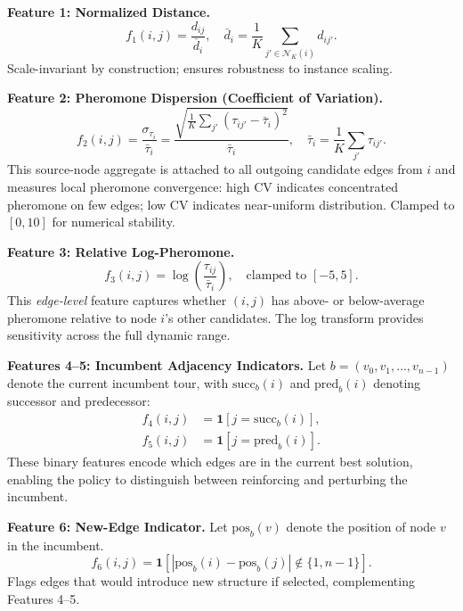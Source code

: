 \documentclass[sigconf,nonacm]{acmart}
\begin{document}
\textbf{Feature 1: Normalized Distance.}
\begin{equation}
f_1(i,j) = \frac{d_{ij}}{\bar{d}_i}, \quad \bar{d}_i = \frac{1}{K} \sum_{j' \in \mathcal{N}_K(i)} d_{ij'}.
\end{equation}
Scale-invariant by construction; ensures robustness to instance scaling.

\textbf{Feature 2: Pheromone Dispersion (Coefficient of Variation).}
\begin{equation}
f_2(i,j) = \frac{\sigma_{\tau_i}}{\bar{\tau}_i} = \frac{\sqrt{\frac{1}{K}\sum_{j'} (\tau_{ij'} - \bar{\tau}_i)^2}}{\bar{\tau}_i}, \quad \bar{\tau}_i = \frac{1}{K}\sum_{j'} \tau_{ij'}.
\end{equation}
This source-node aggregate is attached to all outgoing candidate edges from $i$ and measures local pheromone convergence: high CV indicates concentrated pheromone on few edges; low CV indicates near-uniform distribution.
Clamped to $[0, 10]$ for numerical stability.

\textbf{Feature 3: Relative Log-Pheromone.}
\begin{equation}
f_3(i,j) = \log\!\left(\frac{\tau_{ij}}{\bar{\tau}_i}\right), \quad \text{clamped to } [-5, 5].
\end{equation}
This \emph{edge-level} feature captures whether $(i,j)$ has above- or below-average pheromone relative to node $i$'s other candidates.
The log transform provides sensitivity across the full dynamic range.

\textbf{Features 4--5: Incumbent Adjacency Indicators.}
Let $b = (v_0, v_1, \ldots, v_{n-1})$ denote the current incumbent tour, with $\mathrm{succ}_b(i)$ and $\mathrm{pred}_b(i)$ denoting successor and predecessor:
\begin{align}
f_4(i,j) &= \mathbf{1}[j = \mathrm{succ}_b(i)], \\
f_5(i,j) &= \mathbf{1}[j = \mathrm{pred}_b(i)].
\end{align}
These binary features encode which edges are in the current best solution, enabling the policy to distinguish between reinforcing and perturbing the incumbent.

\textbf{Feature 6: New-Edge Indicator.}
Let $\mathrm{pos}_b(v)$ denote the position of node $v$ in the incumbent.
\begin{equation}
f_6(i,j) = \mathbf{1}\!\left[|\mathrm{pos}_b(i) - \mathrm{pos}_b(j)| \notin \{1, n{-}1\}\right].
\end{equation}
Flags edges that would introduce new structure if selected, complementing Features 4--5.
\end{document}
